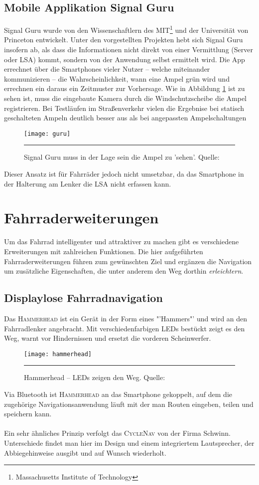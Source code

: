 \subsection*{Mobile Applikation Signal Guru}
Signal Guru wurde von den Wissenschaftlern des MIT\footnote{ Massachusetts Institute of Technology} und der Universität von Princeton entwickelt. Unter den vorgestellten Projekten hebt sich Signal Guru insofern ab, als dass die Informationen nicht direkt von einer Vermittlung (Server oder \gls{LSA}) kommt, sondern von der Anwendung selbst ermittelt wird. Die \Gls{App} errechnet über die \glspl{Smartphone} vieler Nutzer -- welche miteinander kommunizieren -- die Wahrscheinlichkeit, wann eine Ampel grün wird und errechnen ein daraus ein Zeitmuster zur Vorhersage. Wie in Abbildung \ref{fig:AppSignalGuru} ist zu sehen ist, muss die eingebaute Kamera durch die Windschutzscheibe die Ampel registrieren. Bei Testläufen im Straßenverkehr vielen die Ergebnise bei statisch geschalteten Ampeln deutlich besser aus als bei angepassten Ampelschaltungen \cite{SignalGuruPaper} 
\begin{figure}[H]
    \centering
    \texttt{[image: guru]}
    \rule{35em}{0.5pt}
    \caption[Signal Guru]{Signal Guru muss in der Lage sein die Ampel zu 'sehen'.  Quelle: \cite{SignalGuruPaper}} \label{fig:AppSignalGuru}
\end{figure}
Dieser Ansatz ist für Fahrräder jedoch nicht umsetzbar, da das \gls{Smartphone} in der Halterung am Lenker die \gls{LSA} nicht erfassen kann.
%
%
\section{Fahrraderweiterungen}
Um das Fahrrad intelligenter und attraktiver zu machen gibt es verschiedene Erweiterungen mit zahlreichen Funktionen. Die hier aufgeführten Fahrraderweiterungen führen zum gewünschten Ziel und ergänzen die Navigation um zusätzliche Eigenschaften, die unter anderem den Weg dorthin \textit{erleichtern}.
\subsection{Displaylose Fahrradnavigation}
Das \textsc{Hammerhead} ist ein Gerät in der Form eines "'Hammers"' und wird an den Fahrradlenker angebracht. Mit verschiedenfarbigen \glspl{LED} bestückt zeigt es den Weg, warnt vor Hindernissen und ersetzt die vorderen Scheinwerfer.
\begin{figure}[H]
    \centering
    \texttt{[image: hammerhead]}
    \rule{35em}{0.5pt}
    \caption[Hammerhead]{Hammerhead -- \glspl{LED} zeigen den Weg.  Quelle: \cite{Hammerhead}} 
    \label{fig:hammerhead}
\end{figure}
Via Bluetooth ist \textsc{Hammerhead} an das \gls{Smartphone} gekoppelt, auf dem die zugehörige Navigationsanwendung läuft mit der man Routen eingeben, teilen und speichern kann\cite{Hammerhead}.\\\\
Ein sehr ähnliches Prinzip verfolgt das \textsc{CycleNav} von der Firma Schwinn. Unterschiede findet man hier im Design und einem integriertem Lautsprecher, der Abbiegehinweise ausgibt und auf Wunsch wiederholt\cite{CycleNav}.
